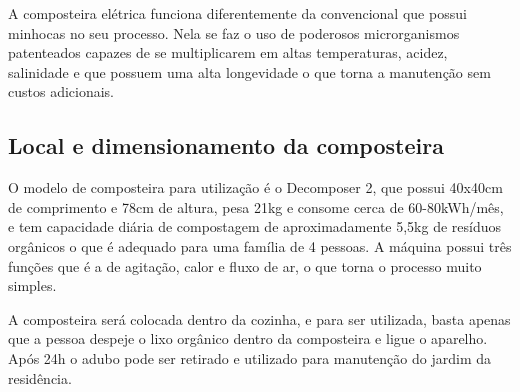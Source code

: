 	A composteira elétrica funciona diferentemente da convencional que possui minhocas no seu processo. Nela se faz o uso de poderosos microrganismos patenteados capazes de se multiplicarem em altas temperaturas, acidez, salinidade e que possuem uma alta longevidade o que torna a manutenção sem custos adicionais.

\subsection{Local e dimensionamento da composteira}

	O modelo de composteira para utilização é o Decomposer 2, que possui 40x40cm de comprimento e 78cm de altura, pesa 21kg e consome cerca de 60-80kWh/mês, e tem capacidade diária de compostagem de aproximadamente 5,5kg de resíduos orgânicos o que é adequado para uma família de 4 pessoas.  A máquina possui três funções que é a de agitação, calor e fluxo de ar, o que torna o processo muito simples.

	A composteira será colocada dentro da cozinha, e para ser utilizada, basta apenas que a pessoa despeje o lixo orgânico dentro da composteira e ligue o aparelho. Após 24h o adubo pode ser retirado e utilizado para manutenção do jardim da residência.


